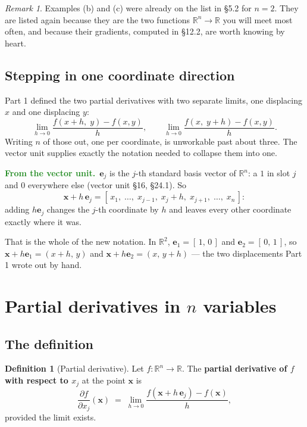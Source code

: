 \documentclass[11pt]{article}
\theoremstyle{plain}
\theoremstyle{definition}
\newtheorem{defn}{Definition}[section]
\theoremstyle{remark}
\newtheorem*{rmk}{Remark}
\newcommand{\lookback}{\par\smallskip\noindent
  \textbf{\sffamily\textcolor{ForestGreen}{From the vector unit.}}\ \ignorespaces}
\newcommand{\R}{\mathbb{R}}
\newcommand{\vc}[1]{\mathbf{#1}}
\newcommand{\pd}[2]{\frac{\partial #1}{\partial #2}}
\begin{document}
\begin{rmk}
Examples (b) and (c) were already on the list in \S5.2 for $n=2$. They are
listed again because they are the two functions $\R^{n}\to\R$ you will meet most
often, and because their gradients, computed in \S12.2, are worth knowing by
heart.
\end{rmk}

\subsection{Stepping in one coordinate direction}
Part 1 defined the two partial derivatives with two separate limits, one
displacing $x$ and one displacing $y$:
\[
  \lim_{h\to0}\frac{f(x+h,\;y)-f(x,y)}{h},
  \qquad
  \lim_{h\to0}\frac{f(x,\;y+h)-f(x,y)}{h} .
\]
Writing $n$ of those out, one per coordinate, is unworkable past about three. The
vector unit supplies exactly the notation needed to collapse them into one.

\lookback $\vc{e}_j$ is the $j$-th standard basis vector of $\R^{n}$: a $1$ in
slot $j$ and $0$ everywhere else (vector unit \S16, \S24.1). So
\[
  \vc{x}+h\,\vc{e}_j
  = [\,x_1,\;\dots,\;x_{j-1},\;x_j+h,\;x_{j+1},\;\dots,\;x_n\,] :
\]
adding $h\vc{e}_j$ changes the $j$-th coordinate by $h$ and leaves every other
coordinate exactly where it was.

That is the whole of the new notation. In $\R^{2}$, $\vc{e}_1=[\,1,\,0\,]$ and
$\vc{e}_2=[\,0,\,1\,]$, so $\vc{x}+h\vc{e}_1=(x+h,\,y)$ and
$\vc{x}+h\vc{e}_2=(x,\,y+h)$ --- the two displacements Part 1 wrote out by hand.

\section{Partial derivatives in \texorpdfstring{$n$}{n} variables}

\subsection{The definition}
\begin{defn}[Partial derivative]
Let $f:\R^{n}\to\R$. The \textbf{partial derivative of $f$ with respect to
$x_j$} at the point $\vc{x}$ is
\begin{equation}\label{eq:partialn}
  \pd{f}{x_j}(\vc{x})
  \;=\;\lim_{h\to0}\frac{f(\vc{x}+h\,\vc{e}_j)-f(\vc{x})}{h},
\end{equation}
provided the limit exists.
\end{defn}
\end{document}
